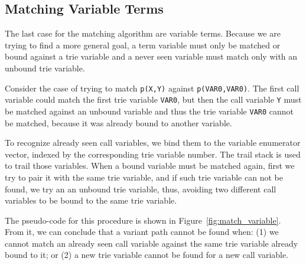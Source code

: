 \subsection{Matching Variable Terms}

The last case for the matching algorithm are variable terms. Because we are trying to find a more general goal,
a term variable must only be matched or bound against a trie variable and a
never seen variable must match only with an unbound trie variable.

Consider the case of trying to match \texttt{p(X,Y)} against \texttt{p(VAR0,VAR0)}.
The first call variable could match the first trie variable \texttt{VAR0},
but then the call variable \texttt{Y} must be matched against an unbound variable and
thus the trie variable \texttt{VAR0} cannot be matched, because it
was already bound to another variable.

To recognize already seen call variables, we bind them to the variable enumerator vector, indexed
by the corresponding trie variable number. The trail stack is used to trail those variables.
When a bound variable must be matched again, first we try to pair it with the same trie variable,
and if such trie variable can not be found, we try an an unbound trie variable, thus,
avoiding two different call variables to be bound to the same trie variable.

The pseudo-code for this procedure is shown in Figure~\ref{fig:match_variable}.
From it, we can conclude that a variant path
cannot be found when:
(1) we cannot match an already seen call variable against the same trie variable already bound to it;
or (2) a new trie variable cannot be found for a new call variable.


